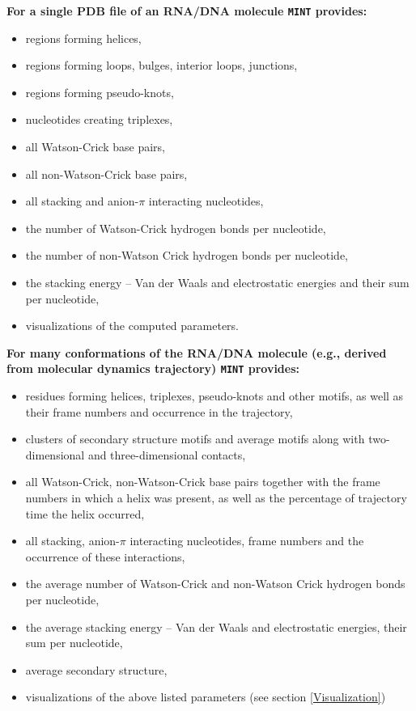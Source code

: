 \documentclass[12pt]{article}
\begin{document}
\textbf{For a single PDB file of an RNA/DNA molecule {\tt MINT} provides:}
\begin{itemize}
\item regions forming helices,
\item regions forming loops, bulges, interior loops, junctions,
\item regions forming pseudo-knots,
\item nucleotides creating triplexes,
\item all Watson-Crick base pairs,
\item all non-Watson-Crick base pairs,
\item all stacking and anion-$\pi$ interacting nucleotides,
\item the number of Watson-Crick hydrogen bonds per nucleotide,
\item the number of non-Watson Crick hydrogen bonds per nucleotide,
\item the stacking energy -- Van der Waals and electrostatic energies and their sum per nucleotide,
\item visualizations of the computed parameters.
\end{itemize}

\noindent
\textbf{For many conformations of the RNA/DNA molecule (e.g., derived from molecular dynamics trajectory) {\tt MINT} provides:}
\begin{itemize}
\item residues forming helices, triplexes, pseudo-knots and other motifs, as well as their frame numbers and occurrence in the trajectory, 
\item clusters of secondary structure motifs and average motifs along with two-dimensional and three-dimensional contacts,
\item all Watson-Crick, non-Watson-Crick base pairs together with the frame numbers in which a helix was present, as well as the percentage of trajectory time the helix occurred,
\item all stacking, anion-$\pi$ interacting nucleotides, frame numbers and the occurrence of these interactions,
\item the average number of Watson-Crick and non-Watson Crick hydrogen bonds per nucleotide,
\item the average stacking energy -- Van der Waals and electrostatic energies, their sum per nucleotide,
\item average secondary structure,
\item visualizations of the above listed parameters (see section \ref{Visualization})
\end{itemize}
\end{document}
